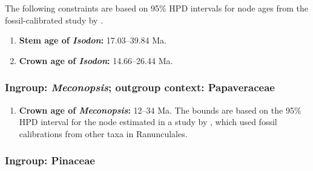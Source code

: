 The following constraints are based on 95\% HPD intervals for node
ages from the fossil-calibrated study by \citet{Yu2014}.

\begin{enumerate}
\item \textbf{Stem age of \textit{Isodon}:} 17.03--39.84 Ma.
\item \textbf{Crown age of \textit{Isodon}:} 14.66--26.44 Ma.
\end{enumerate}

\subsubsection*{Ingroup: \textit{Meconopsis}; outgroup context:
  Papaveraceae}

\begin{enumerate}
\item \textbf{Crown age of \textit{Meconopsis}:} 12--34 Ma. The bounds
  are based on the 95\% HPD interval for the node estimated in a study
  by \citet{Xiao2013}, which used fossil calibrations from other taxa
  in Ranunculales.
\end{enumerate}

\subsubsection*{Ingroup: Pinaceae}


